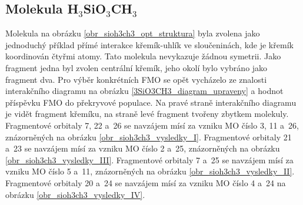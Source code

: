 \documentclass[
  printed, %
  table,   %
  lof,     %
  lot,     %
  oneside,
]{fithesis3}
\begin{document}
\subsection{Molekula H$_3$SiO$_3$CH$_3$}
Molekula  na obrázku \ref{obr_sioh3ch3_opt_struktura} byla zvolena jako jednoduchý příklad přímé interakce křemík-uhlík ve sloučeninách, kde je křemík koordinován čtyřmi atomy. Tato molekula nevykazuje žádnou symetrii. Jako fragment jedna byl zvolen centrální křemík, jeho okolí bylo vybráno jako fragment dva. Pro výběr konkrétních FMO se opět vycházelo ze znalosti interakčního diagramu na obrázku \ref{3SiO3CH3_diagram_upraveny} a hodnot příspěvku FMO do překryvové populace. Na pravé straně interakčního diagramu je vidět fragment křemíku, na straně levé fragment tvořeny zbytkem molekuly. Fragmentové orbitaly  7, 22 a~26 se navzájem mísí za vzniku MO číslo 3, 11 a~26, znázorněných na obrázku \ref{obr_sioh3ch3_vysledky_I}. Fragmentové orbitaly  21 a~23 se navzájem mísí za vzniku MO číslo 2 a~25, znázorněných na obrázku \ref{obr_sioh3ch3_vysledky_III}. Fragmentové orbitaly  7 a~25 se navzájem mísí za vzniku MO číslo 5 a~11, znázorněných na obrázku \ref{obr_sioh3ch3_vysledky_II}. Fragmentové orbitaly  20 a~24 se navzájem mísí za vzniku MO číslo 4 a~24 na obrázku \ref{obr_sioh3ch3_vysledky_IV}.   
\end{document}
